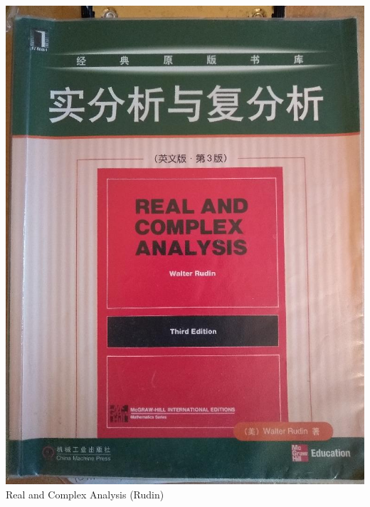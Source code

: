 \documentclass[t]{beamer}
\newcommand{\htarget}[2]{\hypertarget{#1}{#2}}
\begin{document}
\begin{frame}\htarget{RCA}{} \begin{center}
\includegraphics[height=0.8\textheight]{Real_and_Complex_Analysis_Rudin_mini.jpg} \\
Real and Complex Analysis (Rudin)
\end{center} \end{frame}
\end{document}
